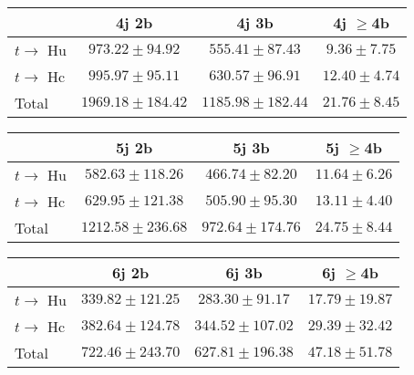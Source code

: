 \begin{table}
\begin{center}
  \begin{tabular}{ | l |  c |  c |  c | }
    \hline \hline 
     & 4j 2b  & 4j 3b  & 4j $\geq$4b  \\ 
    \hline 
     $t\rightarrow$ Hu  &   $ 973.22 \pm 94.92 $ &   $ 555.41 \pm 87.43 $ &   $ 9.36 \pm 7.75 $ \\ 
     $t\rightarrow$ Hc  &   $ 995.97 \pm 95.11 $ &   $ 630.57 \pm 96.91 $ &   $ 12.40 \pm 4.74 $ \\ 
    \hline 
    Total  &   $ 1969.18 \pm 184.42 $ &   $ 1185.98 \pm 182.44 $ &   $ 21.76 \pm 8.45 $ \\ 
    \hline \hline 
  \end{tabular} 


  \begin{tabular}{ | l |  c |  c |  c | }
    \hline \hline 
     & 5j 2b  & 5j 3b  & 5j $\geq$4b  \\ 
    \hline 
     $t\rightarrow$ Hu  &   $ 582.63 \pm 118.26 $ &   $ 466.74 \pm 82.20 $ &   $ 11.64 \pm 6.26 $ \\ 
     $t\rightarrow$ Hc  &   $ 629.95 \pm 121.38 $ &   $ 505.90 \pm 95.30 $ &   $ 13.11 \pm 4.40 $ \\ 
    \hline 
    Total  &   $ 1212.58 \pm 236.68 $ &   $ 972.64 \pm 174.76 $ &   $ 24.75 \pm 8.44 $ \\ 
    \hline \hline 
  \end{tabular} 


  \begin{tabular}{ | l |  c |  c |  c | }
    \hline \hline 
     & 6j 2b  & 6j 3b  & 6j $\geq$4b  \\ 
    \hline 
     $t\rightarrow$ Hu  &   $ 339.82 \pm 121.25 $ &   $ 283.30 \pm 91.17 $ &   $ 17.79 \pm 19.87 $ \\ 
     $t\rightarrow$ Hc  &   $ 382.64 \pm 124.78 $ &   $ 344.52 \pm 107.02 $ &   $ 29.39 \pm 32.42 $ \\ 
    \hline 
    Total  &   $ 722.46 \pm 243.70 $ &   $ 627.81 \pm 196.38 $ &   $ 47.18 \pm 51.78 $ \\ 
    \hline \hline 
  \end{tabular} 


\end{center}
\end{table}
